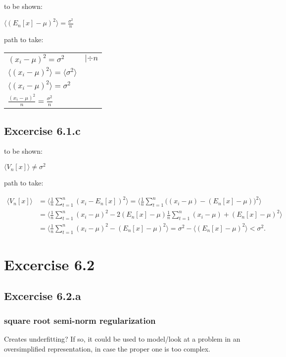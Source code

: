 \documentclass[a4paper,headings=small]{scrartcl}
\numberwithin{equation}{section} %
\numberwithin{figure}{section}   %
\begin{document}
to be shown:

$\langle (E_n[x] - \mu)^2 \rangle = \frac{\sigma^2}{n}$

path to take:

\begin{tabular}{lc}
$(x_i − \mu)^2 = \sigma^2$ & $| \div n$ \\

$\langle (x_i − \mu)^2 \rangle = \langle \sigma^2 \rangle$ \\

$\langle (x_i − \mu)^2 \rangle = \sigma^2$ \\

$\frac{(x_i − \mu)^2}{n} = \frac{\sigma^2}{n}$ \\


\end{tabular}


\subsection{Excercise 6.1.c}

to be shown:

$\langle V_n[x] \rangle \neq \sigma^2$

path to take:

\begin{align}
\langle V_n[x] \rangle
	&= \langle \frac{1}{n}\sum_{t=1}^n (x_i-E_n[x])^2 \rangle
		= \langle \frac{1}{n}\sum_{t=1}^n \big((x_i-\mu)-(E_n[x]-\mu)\big)^2 \rangle \\
	&= \langle \frac{1}{n}\sum_{t=1}^n (x_i-\mu)^2 -
								2(E_n[x]-\mu)\frac{1}{n}\sum_{t=1}^n (x_i-\mu) +
								(E_n[x]-\mu)^2 \rangle \\
	&= \langle \frac{1}{n}\sum_{t=1}^n (x_i-\mu)^2 - (E_n[x]-\mu)^2 \rangle
		= \sigma^2 - \langle (E_n[x]-\mu)^2 \rangle < \sigma^2.
\end{align}


\section{Excercise 6.2}

\subsection{Excercise 6.2.a}

\subsubsection{square root semi-norm regularization}
Creates underfitting?
If so, it could be used to model/look at a problem in an oversimplified representation,
in case the proper one is too complex.
\end{document}
